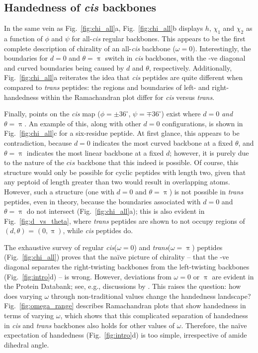 \documentclass[fleqn,10pt,lineno]{wlpeerj} %
\newcommand{\n}[1]{{\color{black}#1}} %
\newcommand{\Fig}[1]{Fig.~\ref{#1}}
\newcommand{\h}{h}
\newcommand{\cis}{{\em{cis}}\xspace}
\newcommand{\trans}{{\em{trans}}\xspace}
\begin{document}
\subsection*{Handedness of \textit{cis} backbones}
In the same vein as \Fig{fig:chi_all}a, \Fig{fig:chi_all}b displays $\h$, $\chi_1$ and $\chi_2$ as a function of $\phi$ and $\psi$ for all-\cis regular backbones. This appears to be the first complete description of chirality of an all-\cis backbone ($\omega=0$). Interestingly, the boundaries for $d=0$ and $\theta=\uppi$ switch in \cis backbones, with the -ve diagonal and curved boundaries being caused by $d$ and $\theta$, respectively. Additionally, \Fig{fig:chi_all}a reiterates the idea that \cis peptides are quite different when compared to \trans peptides: the regions and boundaries of left- and right-handedness within the Ramachandran plot differ for \cis versus \trans. 

Finally, points on the \cis map ($\phi=\pm36^\circ$, $\psi=\mp36^\circ$) exist where $d=0$ {\em and} $\theta=\uppi$. An example of this, along with other $d=0$ configurations, is shown in \Fig{fig:chi_all}c for a six-residue peptide. At first glance, this appears to be contradiction, because $d=0$ indicates the most curved backbone at a fixed $\theta$, and $\theta=\uppi$ indicates the most linear backbone at a fixed $d$\n{; however, it is purely due to the nature of the $cis$ backbone that this indeed is possible.} Of course, this structure would only be possible for cyclic peptides with length two, given that any peptoid of length greater than two would result in overlapping atoms. However, such a structure (one with $d=0$ and $\theta=\uppi$) is not possible in \trans peptides, even in theory, because the boundaries associated with $d=0$ and $\theta=\uppi$ do not intersect (\Fig{fig:chi_all}a); this is also evident in \Fig{fig:d_vs_theta}, where \trans peptides are shown to not occupy regions of $(d,\theta)$ = $(0,\uppi)$, while \cis peptides do.

\n{The exhaustive survey of regular \cis ($\omega=0$) and \trans ($\omega=\uppi$) peptides (\Fig{fig:chi_all}) proves that the na{\"i}ve picture of chirality -- that the -ve diagonal separates the right-twisting backbones from the left-twisting backbones (\Fig{fig:intro}d) -- is wrong.} However, deviations from $\omega = 0$ or $\uppi$ are evident in the Protein Databank; see, e.g., discussions by \cite{Improta2011}. \n{This raises the question:  how does varying $\omega$ through non-traditional values change the handedness landscape?} \Fig{fig:omega_range} describes Ramachandran plots that show \n{handedness} in terms of varying $\omega$\n{, which shows that this complicated separation of handedness in \cis and \trans backbones also holds for other values of $\omega$. Therefore, the} na{\"i}ve expectation of handedness (\Fig{fig:intro}d) is too simple, irrespective of amide dihedral angle.
\end{document}
